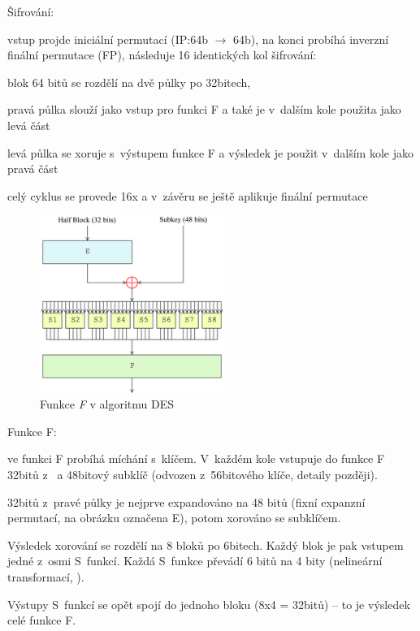 \begin{obecne}{Šifrování:}
\begin{pitemize}
	\item vstup projde iniciální permutací (IP:64b $\rightarrow$ 64b), na konci probíhá inverzní finální permutace (FP), následuje 16 identických kol šifrování:
	\item blok 64 bitů se rozdělí na dvě půlky po 32bitech, 
	\begin{pitemize}
		\item pravá půlka slouží jako vstup pro funkci F a také je v dalším kole použita jako levá část
		\item levá půlka se xoruje s výstupem funkce F a výsledek je použit v dalším kole jako pravá část
	\end{pitemize}
	\item celý cyklus se provede 16x a v závěru se ještě aplikuje finální permutace
\end{pitemize}
\end{obecne}

\begin{figure}[ht]
  \begin{center}
    \includegraphics[width=6cm]{informatika/siete_a_bezpecnost/obrazky/des-f-function.png}
    \caption{Funkce \emph{F} v algoritmu DES}
  \end{center}
\end{figure}

\begin{obecne}{Funkce F:}
\begin{pitemize}
	\item ve funkci F probíhá míchání s klíčem. V každém kole vstupuje do funkce F 32bitů z  a 48bitový subklíč (odvozen z 56bitového klíče, detaily později).
	\item 32bitů z pravé půlky je nejprve expandováno na 48 bitů (fixní expanzní permutací, na obrázku označena E), potom xorováno se subklíčem. 
	\item Výsledek xorování se rozdělí na 8 bloků po 6bitech. Každý blok je pak vstupem jedné z osmi S funkcí. Každá S funkce převádí 6 bitů na 4 bity (nelineární transformací, ).
	\item Výstupy S funkcí se opět spojí do jednoho bloku (8x4 = 32bitů) -- to je výsledek celé funkce F.
\end{pitemize}
\end{obecne}

